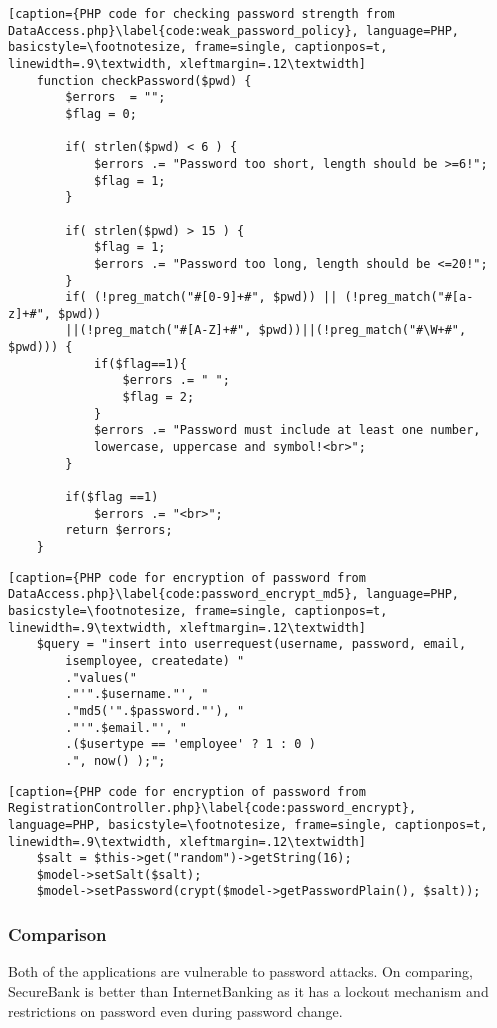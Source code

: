 \begin{lstlisting}[caption={PHP code for checking password strength from DataAccess.php}\label{code:weak_password_policy}, language=PHP, basicstyle=\footnotesize, frame=single, captionpos=t, linewidth=.9\textwidth, xleftmargin=.12\textwidth]
    function checkPassword($pwd) {
        $errors  = "";
        $flag = 0;

        if( strlen($pwd) < 6 ) {
            $errors .= "Password too short, length should be >=6!";
            $flag = 1;
        }

        if( strlen($pwd) > 15 ) {
            $flag = 1;
            $errors .= "Password too long, length should be <=20!";
        }
        if( (!preg_match("#[0-9]+#", $pwd)) || (!preg_match("#[a-z]+#", $pwd))
        ||(!preg_match("#[A-Z]+#", $pwd))||(!preg_match("#\W+#", $pwd))) {
            if($flag==1){
                $errors .= " ";
                $flag = 2;
            }
            $errors .= "Password must include at least one number,
            lowercase, uppercase and symbol!<br>";
        }

        if($flag ==1)
            $errors .= "<br>";
        return $errors;
    }
\end{lstlisting}

\begin{lstlisting}[caption={PHP code for encryption of password from DataAccess.php}\label{code:password_encrypt_md5}, language=PHP, basicstyle=\footnotesize, frame=single, captionpos=t, linewidth=.9\textwidth, xleftmargin=.12\textwidth]
    $query = "insert into userrequest(username, password, email,
        isemployee, createdate) "
        ."values("
        ."'".$username."', "
        ."md5('".$password."'), "
        ."'".$email."', "
        .($usertype == 'employee' ? 1 : 0 )
        .", now() );";
\end{lstlisting}

\begin{lstlisting}[caption={PHP code for encryption of password from RegistrationController.php}\label{code:password_encrypt}, language=PHP, basicstyle=\footnotesize, frame=single, captionpos=t, linewidth=.9\textwidth, xleftmargin=.12\textwidth]
    $salt = $this->get("random")->getString(16);
    $model->setSalt($salt);
    $model->setPassword(crypt($model->getPasswordPlain(), $salt));
\end{lstlisting}

\subsubsection{Comparison}
Both of the applications are vulnerable to password attacks. On comparing, SecureBank is better than InternetBanking as it has a lockout mechanism and restrictions on password even during password change.
\clearpage
